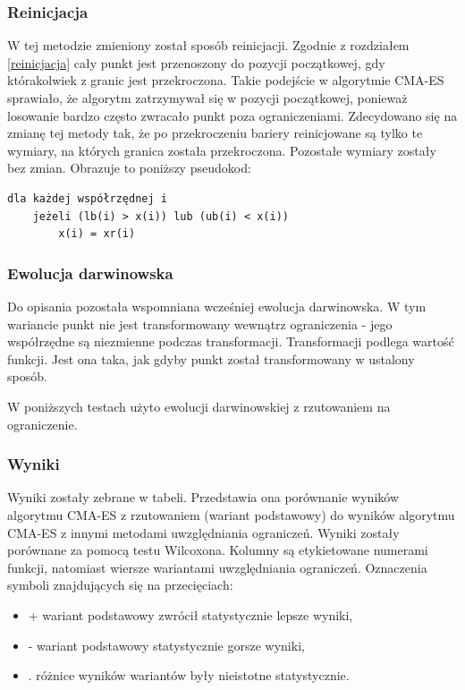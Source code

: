 \documentclass{mini}
\begin{document}
\subsubsection*{Reinicjacja}
W tej metodzie zmieniony został sposób reinicjacji. Zgodnie z rozdziałem \ref{reinicjacja} cały punkt jest przenoszony do pozycji początkowej, gdy którakolwiek z granic jest przekroczona. Takie podejście w algorytmie CMA-ES sprawiało, że algorytm zatrzymywał się w pozycji początkowej, ponieważ losowanie bardzo często zwracało punkt poza ograniczeniami. Zdecydowano się na zmianę tej metody tak, że po przekroczeniu bariery reinicjowane są tylko te wymiary, na których granica została przekroczona. Pozostałe wymiary zostały bez zmian. Obrazuje to poniższy pseudokod:

\begin{Verbatim}[baselinestretch=1.1]
dla każdej współrzędnej i
	jeżeli (lb(i) > x(i)) lub (ub(i) < x(i))
		x(i) = xr(i)
\end{Verbatim}

\subsubsection*{Ewolucja darwinowska}
Do opisania pozostała wspomniana wcześniej ewolucja darwinowska. W tym wariancie punkt nie jest transformowany wewnątrz ograniczenia - jego współrzędne są niezmienne podczas transformacji. Transformacji podlega wartość funkcji. Jest ona taka, jak gdyby punkt został transformowany w ustalony sposób.

W poniższych testach użyto ewolucji darwinowskiej z rzutowaniem na ograniczenie.

\subsubsection *{Wyniki}
Wyniki zostały zebrane w tabeli. Przedstawia ona porównanie wyników algorytmu CMA-ES z rzutowaniem (wariant podstawowy) do wyników algorytmu CMA-ES z innymi metodami uwzględniania ograniczeń. Wyniki zostały porównane za pomocą testu Wilcoxona. Kolumny są etykietowane numerami funkcji, natomiast wiersze wariantami uwzględniania ograniczeń. Oznaczenia symboli znajdujących się na przecięciach:
\begin{itemize}[noitemsep]
\item + wariant podstawowy zwrócił statystycznie lepsze wyniki,
\item - wariant podstawowy statystycznie gorsze wyniki,
\item . różnice wyników wariantów były nieistotne statystycznie.
\end{itemize}
\end{document}
